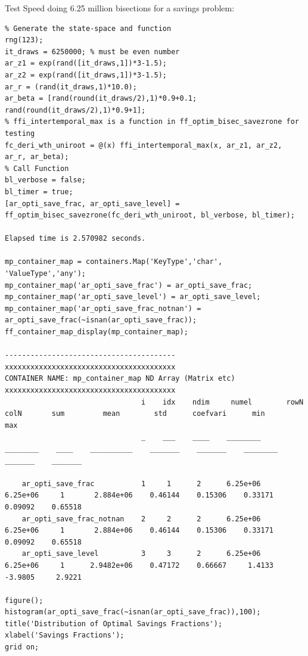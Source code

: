 \documentclass[
]{book}
\begin{document}
Test Speed doing 6.25 million bisections for a savings problem:

\begin{verbatim}
% Generate the state-space and function
rng(123);
it_draws = 6250000; % must be even number
ar_z1 = exp(rand([it_draws,1])*3-1.5);
ar_z2 = exp(rand([it_draws,1])*3-1.5);
ar_r = (rand(it_draws,1)*10.0);
ar_beta = [rand(round(it_draws/2),1)*0.9+0.1; rand(round(it_draws/2),1)*0.9+1]; 
% ffi_intertemporal_max is a function in ff_optim_bisec_savezrone for testing
fc_deri_wth_uniroot = @(x) ffi_intertemporal_max(x, ar_z1, ar_z2, ar_r, ar_beta);
% Call Function
bl_verbose = false;
bl_timer = true;
[ar_opti_save_frac, ar_opti_save_level] = ff_optim_bisec_savezrone(fc_deri_wth_uniroot, bl_verbose, bl_timer);

Elapsed time is 2.570982 seconds.

mp_container_map = containers.Map('KeyType','char', 'ValueType','any');
mp_container_map('ar_opti_save_frac') = ar_opti_save_frac;
mp_container_map('ar_opti_save_level') = ar_opti_save_level;
mp_container_map('ar_opti_save_frac_notnan') = ar_opti_save_frac(~isnan(ar_opti_save_frac));
ff_container_map_display(mp_container_map);

----------------------------------------
xxxxxxxxxxxxxxxxxxxxxxxxxxxxxxxxxxxxxxxx
CONTAINER NAME: mp_container_map ND Array (Matrix etc)
xxxxxxxxxxxxxxxxxxxxxxxxxxxxxxxxxxxxxxxx
                                i    idx    ndim     numel        rowN      colN       sum         mean        std      coefvari      min        max  
                                _    ___    ____    ________    ________    ____    __________    _______    _______    ________    _______    _______

    ar_opti_save_frac           1     1      2      6.25e+06    6.25e+06     1       2.884e+06    0.46144    0.15306    0.33171     0.09092    0.65518
    ar_opti_save_frac_notnan    2     2      2      6.25e+06    6.25e+06     1       2.884e+06    0.46144    0.15306    0.33171     0.09092    0.65518
    ar_opti_save_level          3     3      2      6.25e+06    6.25e+06     1      2.9482e+06    0.47172    0.66667     1.4133     -3.9805     2.9221

figure();
histogram(ar_opti_save_frac(~isnan(ar_opti_save_frac)),100);
title('Distribution of Optimal Savings Fractions');
xlabel('Savings Fractions');
grid on;
\end{verbatim}
\end{document}
